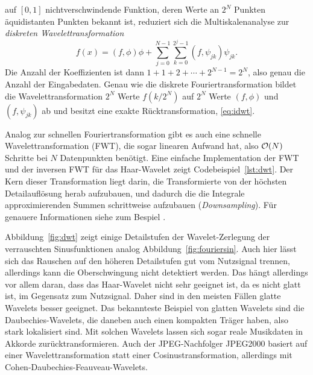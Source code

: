 auf $[0,1]$ nichtverschwindende Funktion, deren Werte an $2^N$ Punkten
äquidistanten Punkten bekannt ist, reduziert sich die
Multiskalenanalyse zur \emph{diskreten
  Wavelettransformation}
\begin{equation}
  \label{eq:idwt}
  f(x) = (f,\phi)\phi +
  \sum_{j=0}^{N-1} \sum_{k=0}^{2^j-1} (f,\psi_{jk})\psi_{jk}.
\end{equation}
Die Anzahl der Koeffizienten ist dann $1 + 1 + 2 + \cdots + 2^{N-1} =
2^N$, also genau die Anzahl der Eingabedaten. Genau wie die diskrete
Fouriertransformation bildet die Wavelettransformation $2^N$ Werte
$f(k/2^N)$ auf $2^N$ Werte $(f,\phi)$ und $(f,\psi_{jk})$ ab und
besitzt eine exakte Rücktransformation, \eqref{eq:idwt}.

Analog zur schnellen Fouriertransformation gibt es auch eine schnelle
Wavelettransformation (FWT), die sogar linearen Aufwand hat, also $\mathcal O(N)$
Schritte bei $N$ Datenpunkten benötigt. Eine einfache Implementation
der FWT und der inversen FWT für das Haar-Wavelet zeigt
Codebeispiel~\ref{lst:dwt}. Der Kern dieser Transformation liegt
darin, die Transformierte von der höchsten Detailauflösung herab
aufzubauen, und dadurch die die Integrale approximierenden Summen
schrittweise aufzubauen (\emph{Downsampling}). Für genauere
Informationen siehe zum Bespiel \textcite{daubechies92a}.

Abbildung~\ref{fig:dwt} zeigt einige Detailstufen der
Wavelet-Zerlegung der verrauschten Sinusfunktionen analog
Abbildung~\ref{fig:fouriersin}. Auch hier lässt sich das Rauschen auf
den höheren Detailstufen gut vom Nutzsignal trennen, allerdings kann
die Oberschwingung nicht detektiert werden. Das hängt allerdings vor
allem daran, dass das Haar-Wavelet nicht sehr geeignet ist, da es
nicht glatt ist, im Gegensatz zum Nutzsignal. Daher sind in den
meisten Fällen glatte Wavelets besser geeignet. Das bekannteste
Beispiel von glatten Wavelets sind die Daubechies-Wavelets, die
daneben auch einen kompakten Träger haben, also stark lokalisiert
sind. Mit solchen Wavelets lassen sich sogar reale Musikdaten in
Akkorde zurücktransformieren. Auch der JPEG-Nachfolger JPEG2000
basiert auf einer Wavelettransformation statt einer
Cosinustransformation, allerdings mit
Cohen-Daubechies-Feauveau-Wavelets.



